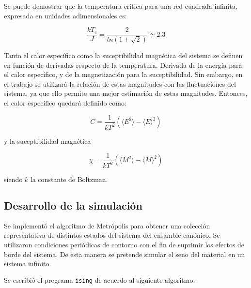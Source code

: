 \documentclass[a4paper,12pt]{article}
\begin{document}
Se puede demostrar \cite{chand1987} que la temperatura crítica para una red 
cuadrada infinita, expresada en unidades adimensionales es:

\begin{equation}
\frac{k T_c }{J} = \frac{2}{ln(1+\sqrt{2})} \simeq 2.3
\end{equation}

Tanto el calor específico como la suceptibilidad magnética del sistema se 
definen en función de derivadas respecto de la temperatura. Derivada de la 
energía para el calor específico, y de la magnetización para la suceptibilidad. 
Sin embargo, en el trabajo se utilizará la relación de estas magnitudes con las 
fluctuaciones del sistema, ya que ello permite una mejor estimación de estas 
magnitudes. Entonces, el calor específico quedará definido como:

\begin{equation}\label{eq:cal_teo}
C  = \frac{1}{kT^2} \left(\langle E^2\rangle - \langle E \rangle^2\right)
\end{equation}

\noindent y la suceptibilidad magnética

\begin{equation}\label{eq:suce_teo}
\chi = \frac{1}{kT^2} \left(\langle M^2\rangle - \langle M \rangle^2\right)
\end{equation}

\noindent siendo $k$ la constante de Boltzman.

\subsection{Desarrollo de la simulación}

Se implementó el algoritmo de Metrópolis para obtener una colección 
representativa de distintos estados del sistema del ensamble canónico. Se 
utilizaron condiciones periódicas de contorno con el fin de suprimir los 
efectos de borde del sistema. De esta manera se pretende simular el seno del 
material en un sistema infinito.

Se escribió el programa \texttt{ising} de acuerdo al siguiente algoritmo:
\end{document}
